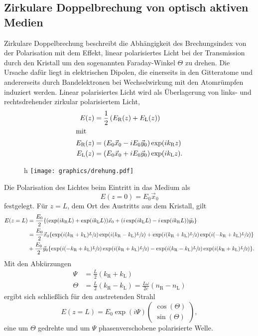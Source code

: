 \subsection{Zirkulare Doppelbrechung von optisch aktiven Medien}
\label{sec:doppel_aktiv}
Zirkulare Doppelbrechung beschreibt die Abhängigkeit des Brechungsindex von der Polarisation mit dem Effekt,
linear polarisiertes Licht bei der Transmission durch den Kristall um den sogenannten Faraday-Winkel $\Theta$ zu drehen.
Die Ursache dafür liegt in elektrischen Dipolen, die einerseits in den Gitteratome und
andererseits durch Bandelektronen bei Wechselwirkung mit den Atomrümpfen induziert werden.
Linear polarisiertes Licht wird als Überlagerung von links- und rechtsdrehender zirkular polarisiertem Licht,
\begin{align}
    E(z) &= \frac{1}{2} \left(E_\text{R}(z)+E_\text{L}(z)\right)\\
    \shortintertext{mit}
    E_\text{R}(z) &= (E_0 \vec x_0 - i E_0 \vec y_0) \exp(ik_\text{R}z)\\
    E_\text{L}(z) &= (E_0 \vec x_0 + i E_0 \vec y_0) \exp(ik_\text{L}z).
\end{align}
\begin{figure}{h}
    \centering
    \texttt{[image: graphics/drehung.pdf]}
\end{figure}
Die Polarisation des Lichtes beim Eintritt in das Medium als
\begin{equation}
    E(z=0) = E_0 \vec x_0
\end{equation}
festgelegt.
Für $z = L$, dem Ort des Austritts aus dem Kristall, gilt
\begin{alignat}{3}
    E(z=L) &= \frac{E_0}{2} \{ (\exp(ik_\text{R}L)+\exp(ik_\text{L}L))\vec x_0 + (i\exp(ik_\text{L}L)-i\exp(ik_\text{R}L))\vec y_0\}\\
    &= \frac{E_0}{2} \vec x_0 \{ \exp(i(k_\text{R}+k_\text{L})\sfrac{L}{2})\exp(i(k_\text{R}-k_\text{L})\sfrac{L}{2}) + \exp(i(k_\text{R}+k_\text{L})\sfrac{L}{2})\exp(i(-k_\text{R}+k_\text{L})\sfrac{L}{2})\}\\
    &+ \frac{E_0}{2}\vec y_0 \{ \exp(i(-k_\text{R}+k_\text{L})\sfrac{L}{2})\exp(i(k_\text{R}+k_\text{L})\sfrac{L}{2}) - \exp(i(k_\text{R}-k_\text{L})\sfrac{L}{2})\exp(i(k_\text{R}+k_\text{L})\sfrac{L}{2}) \}.
\end{alignat}
Mit den Abkürzungen
\begin{align}
    \Psi &= \frac{L}{2} (k_\text{R}+k_\text{L})\\
    \Theta &= \frac{L}{2} (k_\text{R}-k_\text{L}) = \frac{L\omega}{2 c} (n_\text{R}-n_\text{L})
\end{align}
ergibt sich schließlich für den austretenden Strahl
\begin{equation}
    E(z=L) = E_0 \exp(i\Psi)\begin{pmatrix} \cos(\Theta)\\\sin(\Theta)\end{pmatrix},
\end{equation}
eine um $\Theta$ gedrehte und um $\Psi$ phasenverschobene polarisierte Welle.

